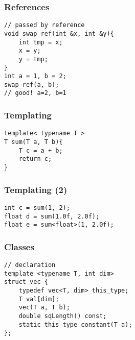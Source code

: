 
\begin{frame}
\end{frame}

\begin{frame}[fragile]
\frametitle{References}
\begin{lstlisting}
// passed by reference
void swap_ref(int &x, int &y){
    int tmp = x;
    x = y;
    y = tmp;
}
int a = 1, b = 2;
swap_ref(a, b);
// good! a=2, b=1
\end{lstlisting}
\end{frame}

\begin{frame}[fragile]
\frametitle{Templating}
\begin{lstlisting}
template< typename T >
T sum(T a, T b){
    T c = a + b;
    return c;
}
\end{lstlisting}
\end{frame}

\begin{frame}[fragile]
\frametitle{Templating (2)}
\begin{lstlisting}
int c = sum(1, 2);
float d = sum(1.0f, 2.0f);
float e = sum<float>(1, 2.0f);
\end{lstlisting}
\end{frame}

\begin{frame}[fragile]
\frametitle{Classes}
\begin{lstlisting}
// declaration
template <typename T, int dim>
struct vec {
    typedef vec<T, dim> this_type;
    T val[dim];
    vec(T a, T b);
    double sqLength() const;
    static this_type constant(T a);
};
\end{lstlisting}
\end{frame}

